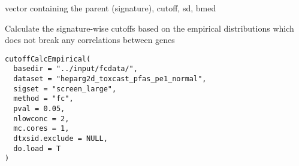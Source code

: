 \documentclass[letterpaper]{book}
\begin{document}
%
\begin{Value}
vector containing the parent (signature), cutoff, sd, bmed
\end{Value}
%
\begin{Description}\relax
Calculate the signature-wise cutoffs based on the empirical distributions
which does not break any correlations between genes
\end{Description}
%
\begin{Usage}
\begin{verbatim}
cutoffCalcEmpirical(
  basedir = "../input/fcdata/",
  dataset = "heparg2d_toxcast_pfas_pe1_normal",
  sigset = "screen_large",
  method = "fc",
  pval = 0.05,
  nlowconc = 2,
  mc.cores = 1,
  dtxsid.exclude = NULL,
  do.load = T
)
\end{verbatim}
\end{Usage}
%
\end{document}
